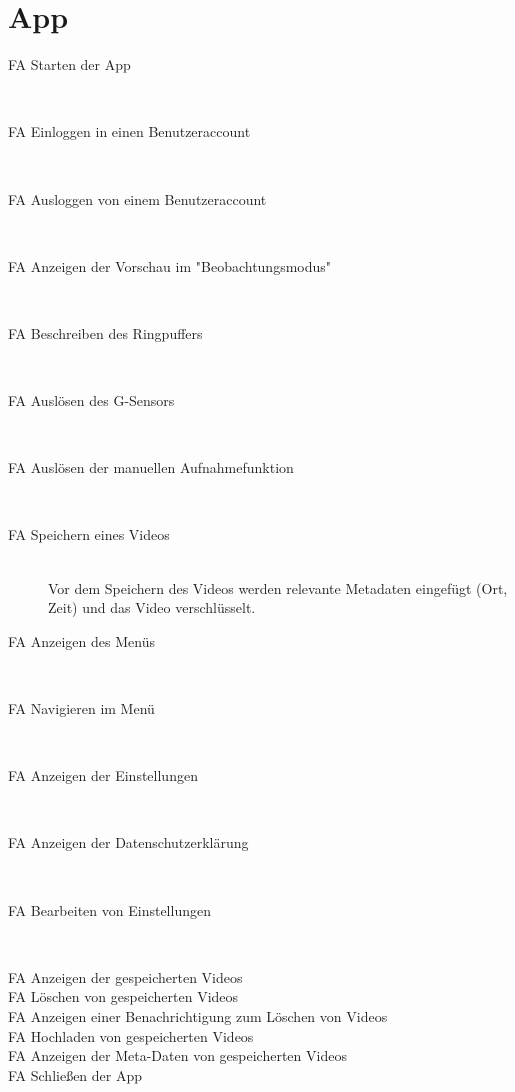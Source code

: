 \section{App}
\begin{description}
\item[FA Starten der App] \hfill \\

\item[FA Einloggen in einen Benutzeraccount] \hfill \\

\item[FA Ausloggen von einem Benutzeraccount] \hfill \\

\item[FA Anzeigen der Vorschau im "Beobachtungsmodus"] \hfill \\

\item[FA Beschreiben des Ringpuffers] \hfill \\

\item[FA Auslösen des G-Sensors] \hfill \\

\item[FA Auslösen der manuellen Aufnahmefunktion] \hfill \\

\item[FA Speichern eines Videos] \hfill \\
Vor dem Speichern des Videos werden relevante Metadaten eingefügt (Ort, Zeit) und das Video verschlüsselt.

\item[FA Anzeigen des Menüs] \hfill \\

\item[FA Navigieren im Menü] \hfill \\

\item[FA Anzeigen der Einstellungen] \hfill \\

\item[FA Anzeigen der Datenschutzerklärung] \hfill \\

\item[FA Bearbeiten von Einstellungen] \hfill \\

\item[FA Anzeigen der gespeicherten Videos]

\item[FA Löschen von gespeicherten Videos]

\item[FA Anzeigen einer Benachrichtigung zum Löschen von Videos]

\item[FA Hochladen von gespeicherten Videos]

\item[FA Anzeigen der Meta-Daten von gespeicherten Videos]

\item[FA Schließen der App]
\end{description}